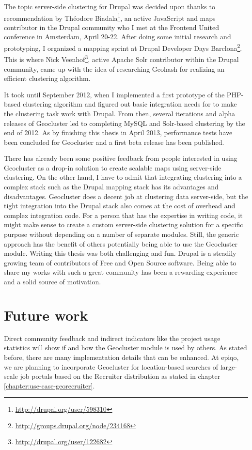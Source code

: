 The topic server-side clustering for Drupal was decided upon thanks to recommendation by Th\'eodore Biadala\footnote{\url{http://drupal.org/user/598310}}, an active JavaScript and maps contributor in the Drupal community who I met at the Frontend United conference in Amsterdam, April 20-22. After doing some initial research and prototyping, I organized a mapping sprint at Drupal Developer Days Barclona\footnote{\url{http://groups.drupal.org/node/234168}}. This is where Nick Veenhof\footnote{\url{http://drupal.org/user/122682}}, active Apache Solr contributor within the Drupal community, came up with the idea of researching Geohash for realizing an efficient clustering algorithm.

It took until September 2012, when I implemented a first prototype of the PHP-based clustering algorithm and figured out basic integration needs for to make the clustering task work with Drupal. From then, several iterations and alpha releases of Geocluster led to completing MySQL and Solr-based clustering by the end of 2012. As by finishing this thesis in April 2013, performance tests have been concluded for Geocluster and a first beta release has been published.

There has already been some positive feedback from people interested in using Geocluster as a drop-in solution to create scalable maps using server-side clustering. On the other hand, I have to admit that integrating clustering into a complex stack such as the Drupal mapping stack has its advantages and disadvantages. Geocluster does a decent job at clustering data server-side, but the tight integration into the Drupal stack also comes at the cost of overhead and complex integration code. For a person that has the expertise in writing code, it might make sense to create a custom server-side clustering solution for a specific purpose without depending on a number of separate modules. Still, the generic approach has the benefit of others potentially being able to use the Geocluster module. Writing this thesis was both challenging and fun. Drupal is a steadily growing team of contributors of Free and Open Source software. Being able to share my works with such a great community has been a rewarding experience and a solid source of motivation. 

\section{Future work}

Direct community feedback and indirect indicators like the project usage statistics will show if and how the Geocluster module is used by others. As stated before, there are many implementation details that can be enhanced. At epiqo, we are planning to incorporate Geocluster for location-based searches of large-scale job portals based on the Recruiter distribution as stated in chapter \ref{chapter:use-case-georecruiter}. 

